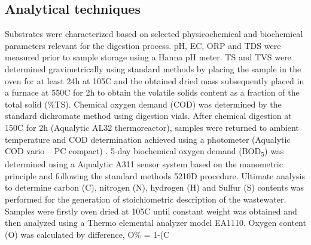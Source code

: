 \subsection{Analytical techniques}
Substrates were characterized based on selected physicochemical and biochemical parameters relevant for the digestion process. pH, EC, ORP and TDS were measured prior to sample storage using a Hanna pH meter. TS and TVS were determined gravimetrically using standard methods by placing the sample in the oven for at least 24h at 105\textdegree C and the obtained dried mass subsequently placed in a furnace at 550\textdegree C for 2h to obtain the volatile solids content as a fraction of the total solid (\%TS). Chemical oxygen demand (COD) was determined by the standard dichromate method using digestion vials. After chemical digestion at 150\textdegree C for 2h (Aqualytic AL32 thermoreactor), samples were returned to ambient temperature and COD determination achieved using a photometer (Aqualytic COD vario – PC compact) \cite{InternationalOrganizationforStandardization2002}. 5‐day biochemical oxygen demand (BOD\textsubscript{5}) was determined using a Aqualytic A311 sensor system based on the manometric principle and following the standard methods 5210D procedure. Ultimate analysis to determine carbon (C), nitrogen (N), hydrogen (H) and Sulfur (S) contents was performed for the generation of stoichiometric description of the wastewater. Samples were firstly oven dried at 105\textdegree C until constant weight was obtained and then analyzed using a Thermo elemental analyzer model EA1110. Oxygen content (O) was calculated by difference, O\% = 1-(C%

